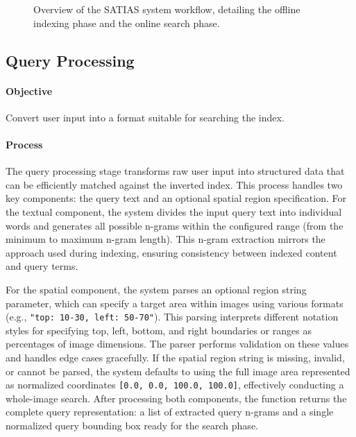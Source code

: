 \documentclass[sigconf,screen]{acmart}
\begin{document}
\begin{figure}[ht!] %
    \centering
    \caption{Overview of the SATIAS system workflow, detailing the offline indexing phase and the online search phase.}
    \label{fig:satias_workflow}
\end{figure}

\subsection{Query Processing}

\paragraph{Objective} Convert user input into a format suitable for searching the index.

\paragraph{Process} The query processing stage transforms raw user input into structured data that can be efficiently matched against the inverted index. This process handles two key components: the query text and an optional spatial region specification. For the textual component, the system divides the input query text into individual words and generates all possible n-grams within the configured range (from the minimum to maximum n-gram length). This n-gram extraction mirrors the approach used during indexing, ensuring consistency between indexed content and query terms.

For the spatial component, the system parses an optional region string parameter, which can specify a target area within images using various formats (e.g., \verb|"top: 10-30, left: 50-70"|). This parsing interprets different notation styles for specifying top, left, bottom, and right boundaries or ranges as percentages of image dimensions. The parser performs validation on these values and handles edge cases gracefully. If the spatial region string is missing, invalid, or cannot be parsed, the system defaults to using the full image area represented as normalized coordinates \verb|[0.0, 0.0, 100.0, 100.0]|, effectively conducting a whole-image search. After processing both components, the function returns the complete query representation: a list of extracted query n-grams and a single normalized query bounding box ready for the search phase.
\end{document}
